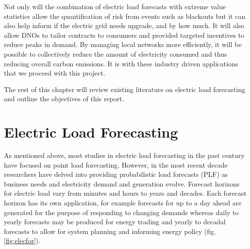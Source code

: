 Not only will the combination of electric load forecasts with extreme value statistics allow the quantification of risk from events such as blackouts but it can also help inform if the electric grid needs upgrade, and by how much. It will also allow DNOs to tailor contracts to consumers and provided targeted incentives to reduce peaks in demand. By managing local networks more efficiently, it will be possible to collectively reduce the amount of electricity consumed and thus reducing overall carbon emissions. It is with these industry driven applications that we proceed with this project.

The rest of this chapter will review existing literature on electric load forecasting and outline the objectives of this report. 




\section{Electric Load Forecasting} \label{subsec:litrev}

As mentioned above, most studies in electric load forecasting in the past century have focused on point load forecasting. However, in the most recent decade researchers have delved into providing probabilistic load forecasts (PLF) as business needs and electricity demand and generation evolve. Forecast horizons for electric load vary from minutes and hours to years and decades. Each forecast horizon has its own application, for example forecasts for up to a day ahead are generated for the purpose of responding to changing demands whereas daily to yearly forecasts may be produced for energy trading and yearly to decadal forecasts to allow for system planning and informing energy policy (fig. \ref{fig:elecfor}).

